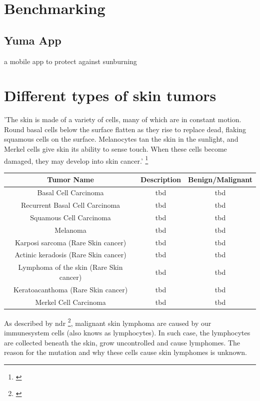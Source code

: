 \section{Benchmarking}
\subsection{Yuma App}
a mobile app to protect against sunburning

\section{Different types of skin tumors}

'The skin is made of a variety of cells, many of which are in constant motion. Round basal cells below the surface flatten as they rise to replace dead, flaking squamous cells on the surface. Melanocytes tan the skin in the sunlight, and Merkel cells give skin its ability to sense touch. When these cells become damaged, they may develop into skin cancer.' \footnote{\cite{skin_cancer_types}} 

\begin{center}
 \begin{tabular}{|| c | c | c ||} 
 \hline
Tumor Name & Description & Benign/Malignant \\ [0.5ex] 
\hline\hline
Basal Cell Carcinoma & tbd & tbd \\
\hline
Recurrent Basal Cell Carcinoma & tbd & tbd \\
 \hline
 Squamous Cell Carcinoma & tbd & tbd \\
 \hline
Melanoma & tbd & tbd \\
 \hline
 Karposi sarcoma (Rare Skin cancer) & tbd & tbd \\
 \hline
  Actinic keradosis (Rare Skin cancer) & tbd & tbd \\
\hline
Lymphoma of the skin (Rare Skin cancer) & tbd & tbd \\
\hline
 Keratoacanthoma (Rare Skin cancer) & tbd & tbd \\
\hline
 Merkel Cell Carcinoma & tbd & tbd \\
 \hline
\end{tabular}
\end{center}



As described by \ac{ndr} \footnote{\cite{ndr_lymphom}}, malignant skin lymphoma are caused by our immunesystem cells (also knows as lymphocytes). In such case, the lymphocytes are collected beneath the skin, grow uncontrolled and cause lymphomes. The reason for the mutation and why these cells cause skin lymphomes is unknown.

